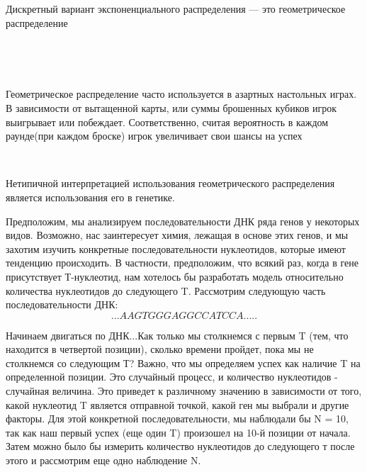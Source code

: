 \documentclass[a4paper,12pt, oneside]{book}
\begin{document}
{{Дискретный вариант экспоненциального распределения — это геометрическое распределение






\newpage
{}\\
\vspace{5mm}

\vspace{5mm}
\\
\vspace{5mm}

Геометрическое распределение часто используется в азартных настольных играх. В зависимости от вытащенной карты, или суммы брошенных кубиков игрок выигрывает или побеждает. Соответственно, считая вероятность в каждом раунде(при каждом броске) игрок увеличивает свои шансы на успех

\vspace{5mm}
\\
\vspace{5mm}

Нетипичной интерпретацией использования геометрического распределения является использования его в генетике.\cite{rt4}

Предположим, мы анализируем последовательности ДНК ряда генов у некоторых видов. Возможно, нас  заинтересует химия, лежащая в основе этих генов, и мы захотим изучить конкретные последовательности нуклеотидов, которые имеют тенденцию происходить. В частности, предположим, что всякий раз, когда в гене присутствует Т-нуклеотид, нам хотелось бы разработать модель относительно количества нуклеотидов до следующего T. Рассмотрим следующую часть последовательности ДНК: 
$$
...AAGTGGGAGGCCATCCA.....
$$

Начинаем двигаться по ДНК...Как только мы столкнемся с первым T (тем, что находится в четвертой позиции), сколько времени пройдет, пока мы не столкнемся со следующим Т? Важно, что мы определяем успех как наличие T на определенной позиции. Это случайный процесс, и количество нуклеотидов - случайная величина. Это приведет к различному значению в зависимости от того, какой нуклеотид T является отправной точкой, какой ген мы выбрали и другие факторы. Для этой конкретной последовательности, мы наблюдали бы N = 10, так как наш первый успех (еще один T) произошел на 10-й позиции от начала. Затем можно было бы измерить количество нуклеотидов до следующего т после этого и рассмотрим еще одно наблюдение N.

}}
\end{document}
